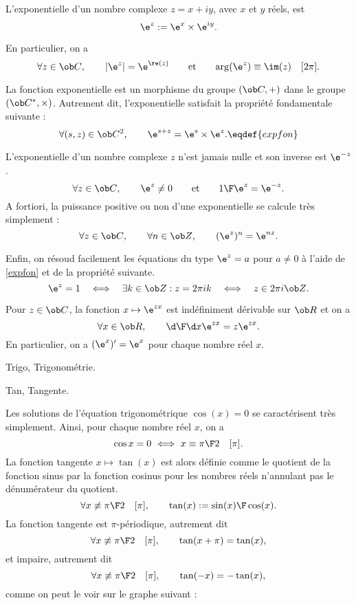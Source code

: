 \Definition [] L'exponentielle d'un nombre complexe $z=x+iy$, avec $x$ et $y$ réels, est 
$$
\e^z:=\e^x\times\e^{iy}.
$$

\noindent
En particulier, on a 
$$
{\forall z\in\ob C}, \qquad {|\e^z|=\e^{\re(z)}}\qquad\mbox{et}
\qquad{\arg(\e^z)\equiv\im(z)\quad[2\pi]}.
$$


\bigskip
\noindent
La fonction exponentielle est un morphisme du groupe $(\ob C,+)$ dans le groupe $(\ob C^*,\times)$. Autrement dit, 
l'exponentielle satisfait la propriété fondamentale suivante : 
$$
{\forall (s,z)\in\ob C^2}, \qquad{\e^{s+z}=\e^s\times\e^z}.\eqdef{expfon}
$$


\bigskip
\noindent
L'exponentielle d'un nombre complexe $z$ n'est jamais nulle et son inverse est $\e^{-z}$.  
$$
{\forall z\in\ob C}, \qquad {\e^z\neq0}\qquad\mbox{et}\qquad {{1\F\e^z}=\e^{-z}}.
$$
A fortiori, la puissance positive ou non d'une exponentielle se calcule très simplement : 
$$
{\forall z\in\ob C},\qquad {\forall n\in\ob Z},\qquad {(\e^z)^n=\e^{nz}}. 
$$

Enfin, on résoud facilement les équations du type $\e^z=a$ pour $a\neq0$ à l'aide de \eqref{expfon} et de la propriété suivante. 
$$
{
\e^z=1\quad \Longleftrightarrow\quad \exists k\in\ob Z: z=2\pi i k\quad \Longleftrightarrow\quad z\in2\pi i\ob Z}.
$$


\Propriete [] Pour $z\in\ob C$, la fonction {$x\mapsto \e^{zx}$ est indéfiniment dérivable sur $\ob R$} et on a 
$$
\forall x\in\ob R, \qquad {{\d\F\d x}\e^{zx}=z\e^{zx}}.
$$
En particulier, on a $(\e^x)'=\e^x$ pour chaque nombre réel $x$. 

\Section Trigo, Trigonométrie. 

\Subsection Tan, Tangente.

Les solutions de l'équation trigonométrique $\cos(x)=0$ se caractérisent très simplement. 
Ainsi, pour chaque nombre réel $x$, on a 
$$
{\cos x=0\ \Longleftrightarrow\ x\equiv {\pi\F2}\quad[\pi]}.
$$
La fonction tangente $x\mapsto\tan(x)$ est alors définie 
comme le quotient de la fonction sinus par la fonction cosinus pour les nombres réels n'annulant pas le dénumérateur du quotient. 
$$
{
\forall x\not\equiv {\pi\F2}\quad[\pi]}, \qquad {\tan(x):={\sin(x)\F\cos(x)}}.
$$
La fonction tangente est $\pi$-périodique, autrement dit 
$$
{
\forall x\not\equiv {\pi\F2}\quad[\pi]}, \qquad {\tan(x+\pi)=\tan(x)},
$$ 
et impaire, autrement dit 
$$
{
\forall x\not\equiv {\pi\F2}\quad[\pi]}, \qquad {\tan(-x)=-\tan(x)}, 
$$
comme on peut le voir sur le graphe suivant : 

